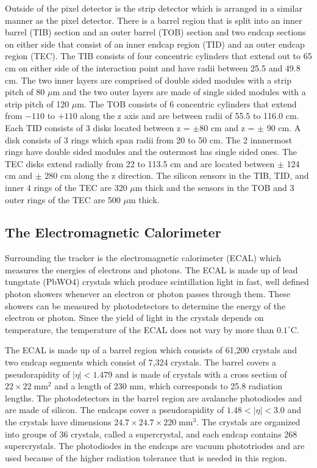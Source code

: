Outside of the pixel detector is the strip detector which is arranged in a similar manner as the pixel detector. There is a barrel region that is split into an inner barrel (TIB) section and an outer barrel (TOB) section and two endcap sections on either side that consist of an inner endcap region (TID) and an outer endcap region (TEC). The TIB consists of four concentric cylinders that extend out to 65 cm on either side of the interaction point and have radii between 25.5 and 49.8 cm. The two inner layers are comprised of double sided modules with a strip pitch of 80 $\mu$m and the two outer layers are made of single sided modules with a strip pitch of 120 $\mu$m. The TOB consists of 6 concentric cylinders that extend from $-110$ to $+110$ along the z axis and are between radii of 55.5 to 116.0 cm. Each TID consists of 3 disks located between z = $\pm 80$ cm and z = $\pm$ 90 cm. A disk consists of 3 rings which span radii from 20 to 50 cm. The 2 innnermost rings have double sided modules and the outermost has single sided ones. The TEC disks extend radially from 22 to 113.5 cm and are located between $\pm$ 124 cm and $\pm$ 280 cm along the z direction. The silicon sensors in the TIB, TID, and inner 4 rings of the TEC are 320 $\mu$m thick and the sensors in the TOB and 3 outer rings of the TEC are 500 $\mu$m thick\cite{CMSExperiment}.

\subsection{The Electromagnetic Calorimeter}

Surrounding the tracker is the electromagnetic calorimeter (ECAL) which measures the energies of electrons and photons. The ECAL is made up of lead tungstate (PbWO4) crystals which produce scintillation light in fast, well defined photon showers whenever an electron or photon passes through them. These showers can be measured by photodetectors to determine the energy of the electron or photon. Since the yield of light in the crystals depends on temperature, the temperature of the ECAL does not vary by more than $0.1^{\circ}$C. 

The ECAL is made up of a barrel region which consists of 61,200 crystals and two endcap segments which consist of 7,324 crystals. The barrel covers a pseudorapidity of $|\eta| < 1.479$ and is made of crystals with a cross section of $22\times22\;\mathrm{mm}^{2}$ and a length of 230 mm, which corresponds to 25.8 radiation lengths. The photodetectors in the barrel region are avalanche photodiodes and are made of silicon. The endcaps cover a pseudorapidity of $1.48 < |\eta| < 3.0$ and the crystals have dimensions $24.7\times24.7\times220\;\mathrm{mm}^{3}$. The crystals are organized into groups of 36 crystals, called a supercrystal, and each endcap contains 268 supercrystals. The photodiodes in the endcaps are vacuum phototriodes and are used because of the higher radiation tolerance that is needed in this region.

